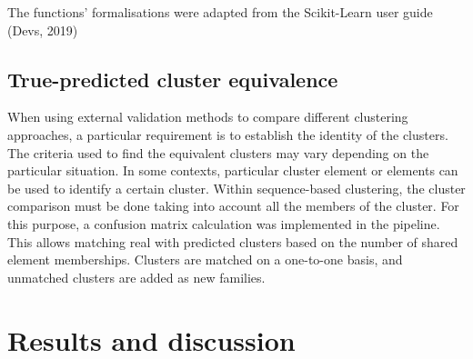 \documentclass[nocrop]{bioinfo}
\begin{document}
\begin{methods}
The functions' formalisations were adapted from the Scikit-Learn user guide (Devs, 2019)

\subsection{True-predicted cluster equivalence}
When using external validation methods to compare different clustering approaches, a particular requirement is to establish the identity of the clusters. The criteria used to find the equivalent clusters may vary depending on the particular situation. In some contexts, particular cluster element or elements can be used to identify a certain cluster. Within sequence-based clustering, the cluster comparison must be done taking into account all the members of the cluster. For this purpose, a confusion matrix calculation was implemented in the pipeline. This allows matching real with predicted clusters based on the number of shared element memberships. Clusters are matched on a one-to-one basis, and unmatched clusters are added as new families.

\end{methods}

\section{Results and discussion}
\end{document}
